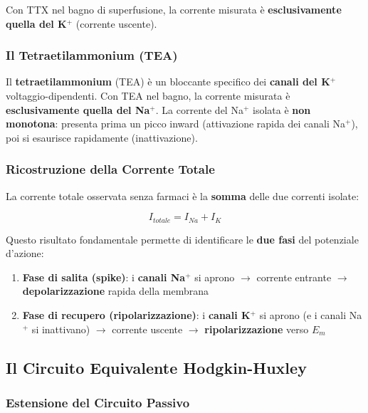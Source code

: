 Con TTX nel bagno di superfusione, la corrente misurata è \textbf{esclusivamente quella del K$^+$} (corrente uscente).

\subsubsection{Il Tetraetilammonium (TEA)}

Il \textbf{tetraetilammonium} (TEA) è un bloccante specifico dei \textbf{canali del K$^+$} voltaggio-dipendenti. Con TEA nel bagno, la corrente misurata è \textbf{esclusivamente quella del Na$^+$}.
La corrente del Na$^+$ isolata è \textbf{non monotona}: presenta prima un picco inward (attivazione rapida dei canali Na$^+$), poi si esaurisce rapidamente (inattivazione).

\subsubsection{Ricostruzione della Corrente Totale}

La corrente totale osservata senza farmaci è la \textbf{somma} delle due correnti isolate:

\begin{equation}
I_{totale} = I_{Na} + I_K
\end{equation}

Questo risultato fondamentale permette di identificare le \textbf{due fasi} del potenziale d'azione:

\begin{enumerate}
    \item \textbf{Fase di salita (spike)}: i \textbf{canali Na$^+$} si aprono $\rightarrow$ corrente entrante $\rightarrow$ \textbf{depolarizzazione} rapida della membrana
    \item \textbf{Fase di recupero (ripolarizzazione)}: i \textbf{canali K$^+$} si aprono (e i canali Na$^+$ si inattivano) $\rightarrow$ corrente uscente $\rightarrow$ \textbf{ripolarizzazione} verso $E_m$
\end{enumerate}



\subsection{Il Circuito Equivalente Hodgkin-Huxley}

\subsubsection{Estensione del Circuito Passivo}

